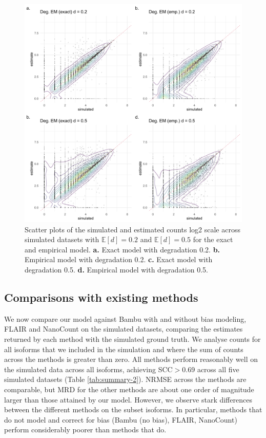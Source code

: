 \begin{figure}[H]
    \centering
    \includegraphics[width=\textwidth]{figures/sec-4-1-scatter-hard.png}
    \caption[Scatter plots across simulated datasets for model variations]{Scatter plots of the simulated and estimated counts log2 scale across simulated datasets with $\mathbb{E}[d]=0.2$ and $\mathbb{E}[d]=0.5$ for the exact and empirical model. \textbf{a.} Exact model with degradation 0.2. \textbf{b.} Empirical model with degradation 0.2. \textbf{c.} Exact model with degradation 0.5. \textbf{d.} Empirical model with degradation 0.5.}
    \label{fig:4-1-scatter}
\end{figure}

\subsection{Comparisons with existing methods}

We now compare our model against Bambu with and without bias modeling, FLAIR and NanoCount on the simulated datasets, comparing the estimates returned by each method with the simulated ground truth. We analyse counts for all isoforms that we included in the simulation and where the sum of counts across the methods is greater than zero. All methods perform reasonably well on the simulated data across all isoforms, achieving SCC$>$0.69 across all five simulated datasets (Table \ref{tab:summary-2}). NRMSE across the methods are comparable, but MRD for the other methods are about one order of magnitude larger than those attained by our model. However, we observe stark differences between the different methods on the subset isoforms. In particular, methods that do not model and correct for bias (Bambu (no bias), FLAIR, NanoCount) perform considerably poorer than methods that do.   

